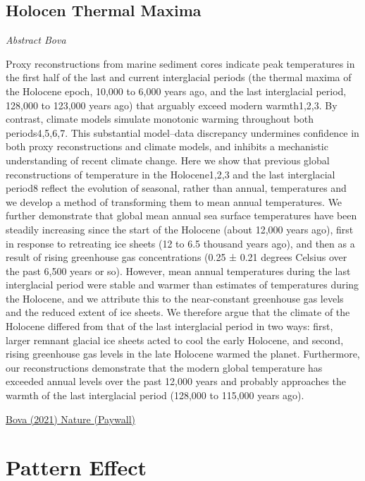 \documentclass[
]{book}
\begin{document}
\hypertarget{holocen-thermal-maxima}{%
\section{Holocen Thermal Maxima}\label{holocen-thermal-maxima}}

\emph{Abstract Bova}

Proxy reconstructions from marine sediment cores indicate peak temperatures in the first half of the last and current interglacial periods (the thermal maxima of the Holocene epoch, 10,000 to 6,000 years ago, and the last interglacial period, 128,000 to 123,000 years ago) that arguably exceed modern warmth1,2,3. By contrast, climate models simulate monotonic warming throughout both periods4,5,6,7. This substantial model--data discrepancy undermines confidence in both proxy reconstructions and climate models, and inhibits a mechanistic understanding of recent climate change. Here we show that previous global reconstructions of temperature in the Holocene1,2,3 and the last interglacial period8 reflect the evolution of seasonal, rather than annual, temperatures and we develop a method of transforming them to mean annual temperatures. We further demonstrate that global mean annual sea surface temperatures have been steadily increasing since the start of the Holocene (about 12,000 years ago), first in response to retreating ice sheets (12 to 6.5 thousand years ago), and then as a result of rising greenhouse gas concentrations (0.25 ± 0.21 degrees Celsius over the past 6,500 years or so). However, mean annual temperatures during the last interglacial period were stable and warmer than estimates of temperatures during the Holocene, and we attribute this to the near-constant greenhouse gas levels and the reduced extent of ice sheets. We therefore argue that the climate of the Holocene differed from that of the last interglacial period in two ways: first, larger remnant glacial ice sheets acted to cool the early Holocene, and second, rising greenhouse gas levels in the late Holocene warmed the planet. Furthermore, our reconstructions demonstrate that the modern global temperature has exceeded annual levels over the past 12,000 years and probably approaches the warmth of the last interglacial period (128,000 to 115,000 years ago).

\href{https://www.nature.com/articles/s41586-020-03155-x}{Bova (2021) Nature (Paywall)}

\hypertarget{pattern-effect}{%
\chapter{Pattern Effect}\label{pattern-effect}}
\end{document}
